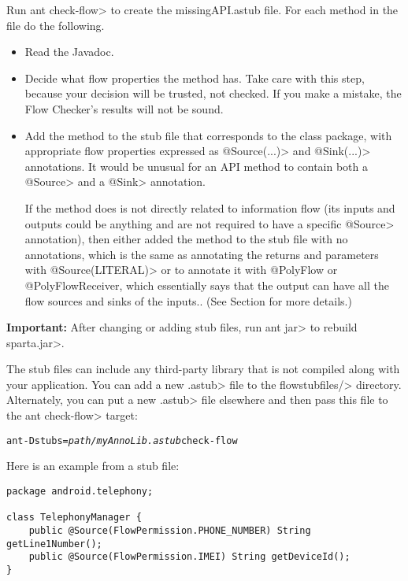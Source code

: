 Run \<ant check-flow> to create the missingAPI.astub file. For each method in the 
file do the following.  
\begin{itemize}
\item
Read the Javadoc.
\item
Decide what flow properties the method has.  Take care with this step,
because your decision will be trusted, not checked.  If you make a mistake,
the Flow Checker's results will not be sound.
\item
Add the method to the stub file that corresponds to the class package, with
appropriate flow properties expressed as \<@Source(...)> and
\<@Sink(...)> annotations.
It would be unusual for an API method to contain both a \<@Source>
and a \<@Sink> annotation.

If the method does is not directly related to information flow (its inputs
and outputs could be anything and are not required to have a specific
\<@Source> annotation), then either added the method to the stub file with no 
annotations, which is the same as annotating the returns and parameters with 
\<@Source(LITERAL)> or to annotate it with @PolyFlow or @PolyFlowReceiver, 
which essentially says that the
output can have all the flow sources and sinks of the inputs..
(See Section  for more details.)

\end{itemize}

\noindent
\textbf{Important:}
After changing or adding stub files, run \<ant jar> to rebuild \<sparta.jar>.



The stub files can include any third-party library that is not compiled
along with your application.  You can add a new \<.astub> file to the
\<flowstubfiles/> directory.
Alternately, you can put a new \<.astub> file elsewhere and then pass this
file to the \<ant check-flow> target:

\begin{alltt}
ant -Dstubs=\emph{path/myAnnoLib.astub} check-flow
\end{alltt}

Here is an example from a stub file:

\begin{Verbatim}
package android.telephony;

class TelephonyManager {
    public @Source(FlowPermission.PHONE_NUMBER) String getLine1Number();
    public @Source(FlowPermission.IMEI) String getDeviceId();
}
\end{Verbatim}

